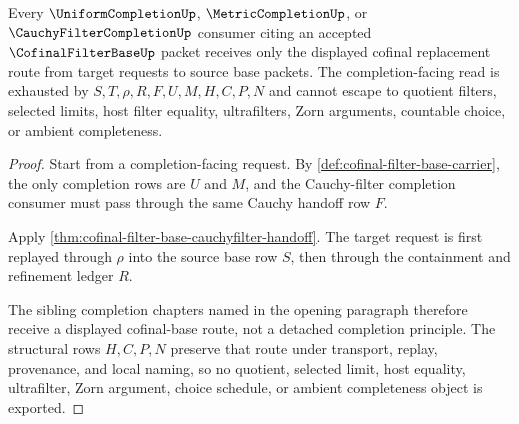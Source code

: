 \begin{theorem}
\label{thm:cofinal-filter-base-completion-nonescape}
Every $\UniformCompletionUp$, $\MetricCompletionUp$, or $\CauchyFilterCompletionUp$ consumer citing an accepted $\CofinalFilterBaseUp$ packet receives only the displayed cofinal replacement route from target requests to source base packets. The completion-facing read is exhausted by $S,T,\rho,R,F,U,M,H,C,P,N$ and cannot escape to quotient filters, selected limits, host filter equality, ultrafilters, Zorn arguments, countable choice, or ambient completeness.
\end{theorem}
\begin{proof}
Start from a completion-facing request. By \autoref{def:cofinal-filter-base-carrier}, the only completion rows are $U$ and $M$, and the Cauchy-filter completion consumer must pass through the same Cauchy handoff row $F$.

Apply \autoref{thm:cofinal-filter-base-cauchyfilter-handoff}. The target request is first replayed through $\rho$ into the source base row $S$, then through the containment and refinement ledger $R$.

The sibling completion chapters named in the opening paragraph therefore receive a displayed cofinal-base route, not a detached completion principle. The structural rows $H,C,P,N$ preserve that route under transport, replay, provenance, and local naming, so no quotient, selected limit, host equality, ultrafilter, Zorn argument, choice schedule, or ambient completeness object is exported.
\end{proof}


\begin{closurestatus}{\CofinalFilterBaseUp}
  \theoryclosure{\seedClosure}
  \formalstatus{\unformalizedV}
\end{closurestatus}
